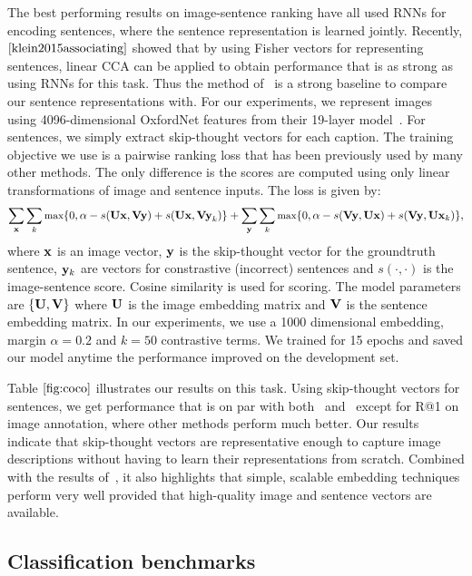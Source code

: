 \documentclass{article} \usepackage{nips15submit_e,times}
\begin{document}
The best performing results on image-sentence ranking have all used RNNs for encoding sentences, where the sentence representation is learned jointly. Recently, $\cite{klein2015associating}$ showed that by using Fisher vectors for representing sentences, linear CCA can be applied to obtain performance that is as strong as using RNNs for this task. Thus the method of~\cite{klein2015associating} is a strong baseline to compare our sentence representations with. For our experiments, we represent images using 4096-dimensional OxfordNet features from their 19-layer model~\cite{simonyan2014very}. For sentences, we simply extract skip-thought vectors for each caption. The training objective we use is a pairwise ranking loss that has been previously used by many other methods. The only difference is the scores are computed using only linear transformations of image and sentence inputs. The loss is given by:
\begin{eqnarray}
\small{
\label{eq:rank}
\sum_{\bf x} \sum_k \text{max}\{0, \alpha - s({\bf Ux}, {\bf Vy}) + s({\bf Ux}, {\bf Vy}_k)\} + \sum_{\bf y} \sum_k \text{max}\{0, \alpha - s({\bf Vy}, {\bf Ux}) + s({\bf Vy}, {\bf Ux}_k)\}, }
\nonumber 
\end{eqnarray}
where ${\bf x}$ is an image vector, ${\bf y}$ is the skip-thought vector for the groundtruth sentence, ${\bf y}_k$ are vectors for constrastive (incorrect) sentences and $s(\cdot, \cdot)$ is the image-sentence score. Cosine similarity is used for scoring. The model parameters are $\{{\bf U}, {\bf V} \}$ where ${\bf U}$ is the image embedding matrix and ${\bf V}$ is the sentence embedding matrix. In our experiments, we use a 1000 dimensional embedding, margin $\alpha = 0.2$ and $k=50$ contrastive terms. We trained for 15 epochs and saved our model anytime the performance improved on the development set.

Table$~\ref{fig:coco}$ illustrates our results on this task. Using skip-thought vectors for sentences, we get performance that is on par with both~\cite{Karpathy15} and~\cite{klein2015associating} except for R@1 on image annotation, where other methods perform much better. Our results indicate that skip-thought vectors are representative enough to capture image descriptions without having to learn their representations from scratch. Combined with the results of~\cite{klein2015associating}, it also highlights that simple, scalable embedding techniques perform very well provided that high-quality image and sentence vectors are available.


\subsection{Classification benchmarks}
\end{document}
